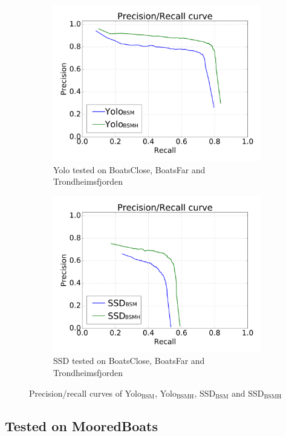 \begin{figure}[h!]
\begin{subfigure}{.5\textwidth}
  \centering
  \includegraphics[width=0.8\linewidth]{results/case_buildings/prec_recall/yolo/bcbftrf-eps.png}
  \caption{Yolo tested on BoatsClose, BoatsFar and Trondheimsfjorden}
  \label{fig:sfig1}
\end{subfigure}%
\begin{subfigure}{.5\textwidth}
  \centering
  \includegraphics[width=.8\linewidth]{results/case_buildings/prec_recall/ssd/bcbftrf-eps.png}
  \caption{SSD tested on BoatsClose, BoatsFar and Trondheimsfjorden}
  \label{fig:sfig2}
\end{subfigure}
\caption{Precision/recall curves of Yolo$_{\text{BSM}}$, Yolo$_{\text{BSMH}}$, SSD$_{\text{BSM}}$ and SSD$_{\text{BSMH}}$}
\label{fig:case_build}
\end{figure}

\newpage
\clearpage

\subsection{Tested on MooredBoats}

